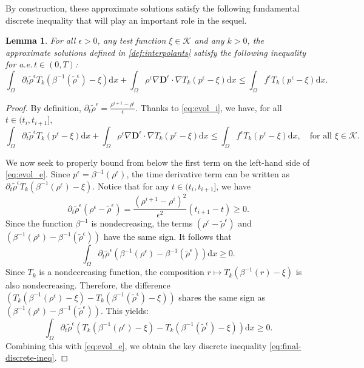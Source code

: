 \documentclass[final,reqno]{amsart}
\theoremstyle{plain}
\newtheorem{lemma}{Lemma}	%
\theoremstyle{definition}
\theoremstyle{remark}
\numberwithin{remark}{section}	%
\numberwithin{example}{section}	%
\newcommand{\de}{\mathbf{D}}
\newcommand{\K}{\mathcal K}
\newcommand{\pp}{a.e.\,}
\newcommand{\dd}{\mathrm{d}}
\begin{document}
By construction, these approximate solutions satisfy the following fundamental discrete inequality that will play an important role in the sequel.
\begin{lemma}\label{lem:d-ineq}
	For all $\epsilon>0$, any test function $\xi\in\K$ and any $k>0$, the approximate solutions defined in \cref{def:interpolants} satisfy the following inequality for \pp $t\in (0,T)$:
	\begin{equation}\label{eq:final-discrete-ineq}
    \int_{\Omega} \partial_t \tilde{\rho}^{\epsilon} T_k(\beta^{-1}(\tilde{\rho}^{\epsilon})-\xi) \dd x + \int_{\Omega} \rho^{\epsilon} \nabla \de^{\epsilon} \cdot \nabla T_k(p^{\epsilon}-\xi) \dd x \le \int_{\Omega} f^{\epsilon} T_k(p^{\epsilon}-\xi) \dd x.
\end{equation}
\end{lemma}
\begin{proof}
	By definition, $\partial_t \tilde{\rho}^\epsilon = \frac{\rho^{i+1}-\rho^{i}}{\epsilon}$. Thanks to \eqref{eq:evol_i}, we have, for all $t \in (t_i, t_{i+1}]$,
\begin{equation}\label{eq:evol_e}
    \int_{\Omega} \partial_t \tilde{\rho}^{\epsilon} T_k (p^\epsilon-\xi) \dd x + \int_{\Omega} \rho^\epsilon \nabla \de^\epsilon \cdot \nabla T_k(p^\epsilon-\xi) \dd x \le \int_{\Omega} f^\epsilon T_k(p^\epsilon-\xi) \dd x, \quad \text{for all } \xi \in \K.
\end{equation}

We now seek to properly bound from below the first term on the left-hand side of \eqref{eq:evol_e}. Since $p^\epsilon = \beta^{-1}(\rho^\epsilon)$, the time derivative term can be written as $\partial_t \tilde{\rho}^{\epsilon} T_k (\beta^{-1}(\rho^\epsilon)-\xi)$. Notice that for any $t \in (t_i, t_{i+1}]$, we have
\[
    \partial_t\tilde{\rho}^{\epsilon}(\rho^\epsilon-\tilde{\rho}^\epsilon) = \frac{(\rho^{i+1}-\rho^{i})^2}{\epsilon^2}(t_{i+1}-t) \geq 0.
\]
Since the function $\beta^{-1}$ is nondecreasing, the terms $(\rho^\epsilon-\tilde{\rho}^\epsilon)$ and $(\beta^{-1}(\rho^\epsilon)-\beta^{-1}(\tilde{\rho}^\epsilon))$ have the same sign. It follows that 
\[
    \int_{\Omega} \partial_t\tilde{\rho}^{\epsilon} \left( \beta^{-1}(\rho^\epsilon) - \beta^{-1}(\tilde{\rho}^\epsilon) \right) \dd x \geq 0.
\]
Since $T_k$ is a nondecreasing function, the composition $r \mapsto T_k(\beta^{-1}(r) - \xi)$ is also nondecreasing. Therefore, the difference $\left( T_k(\beta^{-1}(\rho^\epsilon) - \xi) - T_k(\beta^{-1}(\tilde{\rho}^\epsilon) - \xi)\right)$ shares the same sign as $(\beta^{-1}(\rho^\epsilon)-\beta^{-1}(\tilde{\rho}^\epsilon))$. This yields:
\[
    \int_{\Omega} \partial_t \tilde{\rho}^\epsilon \left( T_k(\beta^{-1}(\rho^\epsilon) - \xi) - T_k(\beta^{-1}(\tilde{\rho}^\epsilon) - \xi)\right)\dd x \geq 0.
\]
Combining this with \eqref{eq:evol_e}, we obtain the key discrete inequality \eqref{eq:final-discrete-ineq}.
\end{proof}
\end{document}
